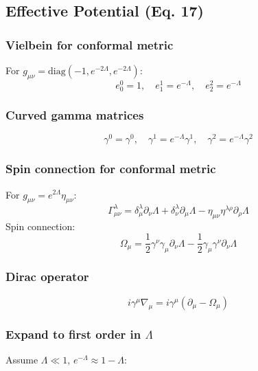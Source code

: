 \documentclass[12pt]{article}
\begin{document}
\subsection{Effective Potential (Eq. 17)}

\subsubsection{Vielbein for conformal metric}
For $g_{\mu\nu} = \text{diag}(-1, e^{-2\Lambda}, e^{-2\Lambda})$:
\begin{equation}
    e_0^0 = 1, \quad e_1^1 = e^{-\Lambda}, \quad e_2^2 = e^{-\Lambda}
\end{equation}

\subsubsection{Curved gamma matrices}
\begin{equation}
    \gamma^0 = \gamma^0, \quad \gamma^1 = e^{-\Lambda} \gamma^1, \quad \gamma^2 = e^{-\Lambda} \gamma^2
\end{equation}

\subsubsection{Spin connection for conformal metric}
For $g_{\mu\nu} = e^{2\Lambda}\eta_{\mu\nu}$:
\begin{equation}
    \Gamma^\lambda_{\mu\nu} = \delta^\lambda_\mu \partial_\nu \Lambda + \delta^\lambda_\nu \partial_\mu \Lambda - \eta_{\mu\nu}\eta^{\lambda\rho}\partial_\rho\Lambda
\end{equation}
Spin connection:
\begin{equation}
    \Omega_\mu = \frac{1}{2} \gamma^\nu \gamma_\mu \partial_\nu \Lambda - \frac{1}{2} \gamma_\mu \gamma^\nu \partial_\nu \Lambda
\end{equation}

\subsubsection{Dirac operator}
\begin{equation}
    i\gamma^\mu \nabla_\mu = i\gamma^\mu (\partial_\mu - \Omega_\mu)
\end{equation}

\subsubsection{Expand to first order in $\Lambda$}
Assume $\Lambda \ll 1$, $e^{-\Lambda} \approx 1 - \Lambda$:
\end{document}
